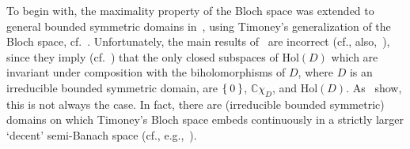 \documentclass[10.5pt,reqno]{amsart}
\newcommand{\Hol}{\mathrm{Hol}}
\newcommand{\C}{\mathds{C}}
\begin{document}
To begin with, the maximality property of the Bloch space was  extended to general bounded symmetric domains  in~\cite{Timoney2}, using Timoney's generalization of the Bloch space, cf.~\cite{Timoney1}. Unfortunately, the main results of~\cite{Timoney2} are  incorrect (cf., also,~\cite{Agranovski,Survey}), since they imply (cf.~\cite[Corollary 0.2]{Timoney2}) that the only closed subspaces of $\Hol(D)$ which are invariant under composition with the biholomorphisms of $D$, where $D$ is an irreducible bounded symmetric domain, are $\Set{0}$, $\C \chi_D$, and $\Hol(D)$. As~\cite[Proposition 4.12 and the following remarks]{Arazy} show, this is not always the case. In fact, there are (irreducible bounded symmetric) domains on which Timoney's Bloch space embeds continuously in a strictly larger `decent' semi-Banach space (cf., e.g.,~\cite[Theorem 1.3]{Garrigos}).
\end{document}
